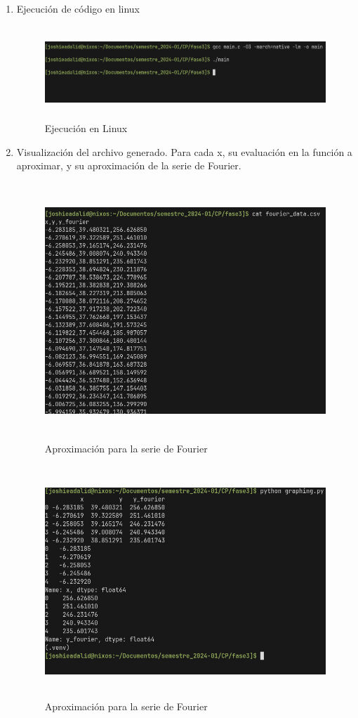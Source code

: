 \begin{enumerate} 
	\def\labelenumi{\arabic{enumi}.} 
	\item Ejecución de código en linux
	
	\begin{figure}[H]
		\centering
		\includegraphics[width=6.26772in,height=1.375in]{media/image29.png}
		\caption{Ejecución en Linux}
	\end{figure}
	
	\item Visualización del archivo generado. Para cada x, su evaluación en la función a aproximar, y su aproximación de la serie de Fourier.
	
	\begin{figure}[H]
		\centering
		\includegraphics[width=5.16146in,height=3.79822in]{media/image37.png}
		\caption{Aproximación para la serie de Fourier}
	\end{figure}
	
	\begin{figure}[H]
		\centering
		\includegraphics[width=5.16146in,height=3.42309in]{media/image25.png}
		\caption{Aproximación para la serie de Fourier}
	\end{figure}
	

\end{enumerate}
